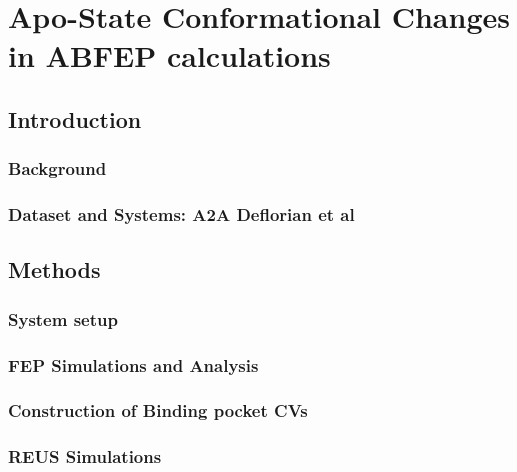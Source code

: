 \chapter{Apo-State Conformational Changes in ABFEP calculations}
\label{ch:apo-state-conformational-changes}
\label{ch:binding-pocket-resolvation}
\section{Introduction}

\lipsum[1][1-3]

\subsection{Background}

\lipsum[1][1-3]

\subsection{Dataset and Systems: A2A Deflorian et al}

\lipsum[1][1-3]

\section{Methods}

\lipsum[1][1-3]

\subsection{System setup}

\lipsum[1][1-3]

\subsection{FEP Simulations and Analysis}

\lipsum[1][1-3]

\subsection{Construction of Binding pocket CVs}

\lipsum[1][1-3]

\subsection{REUS Simulations}

